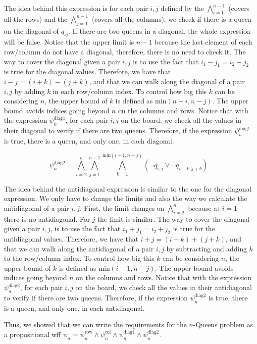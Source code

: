 \documentclass[11pt]{article}
\begin{document}
The idea behind this expression is for each pair $i, j$ defined by the $\bigwedge\limits_{i=1}^{n-1}$ (covers all the rows) and the $\bigwedge\limits_{j=1}^{n-1}$ (covers all the columns), we check if there is a queen on the diagonal of $q_{ij}$. If there are two queens in a diagonal, the whole expression will be false. Notice that the upper limit is $n-1$ because the last element of each row/column do not have a diagonal, therefore, there is no need to check it. The way to cover the diagonal given a pair $i, j$ is to use the fact that $i_1 - j_1 = i_2 - j_2$ is true for the diagonal values. Therefore, we have that $i - j = (i + k) - (j + k)$, and that we can walk along the diagonal of a pair $i, j$ by adding $k$ in each row/column index. To control how big this $k$ can be considering $n$, the upper bound of $k$ is defined as $\text{min}(n-i, n-j)$. The upper bound avoids indices going beyond $n$ on the columns and rows. Notice that with the expression $\psi_n^{\text{diag1}}$, for each pair $i,j$ on the board, we check all the values in their diagonal to verify if there are two queens. Therefore, if the expression $\psi_n^{\text{diag1}}$ is true, there is a queen, and only one, in each diagonal.

$$\psi_n^{\text{diag2}} = \bigwedge_{i=2}^{n}\bigwedge_{j=1}^{n-1}\bigwedge_{k=1}^{\text{min}(i-1, n-j)} (\lnot q_{i, j} \lor \lnot q_{i-k,j+k})$$

The idea behind the antidiagonal expression is similar to the one for the diagonal expression. We only have to change the limits and also the way we calculate the antidiagonal of a pair $i, j$. First, the limit changes on $\bigwedge\limits_{i=2}^{n}$ because at $i = 1$ there is no antidiagonal. For $j$ the limit is similar. The way to cover the diagonal given a pair $i, j$, is to use the fact that $i_1 + j_1 = i_2 + j_2$ is true for the antidiagonal values. Therefore, we have that $i + j = (i - k) + (j + k)$, and that we can walk along the antidiagonal of a pair $i,j$ by subtracting and adding $k$ to the row/column index. To control how big this $k$ can be considering $n$, the upper bound of $k$ is defined as $\text{min}(i-1, n-j)$. The upper bound avoids indices going beyond $n$ on the columns and rows.  Notice that with the expression $\psi_n^{\text{diag2}}$, for each pair $i,j$ on the board, we check all the values in their antidiagonal to verify if there are two queens. Therefore, if the expression $\psi_n^{\text{diag2}}$ is true, there is a queen, and only one, in each antidiagonal.

Thus, we showed that we can write the requirements for the $n$-Queens problem as a propositional wff $\psi_n = \psi_n^{\text{row}} \land \psi_n^{\text{col}} \land \psi_n^{\text{diag1}} \land \psi_n^{\text{diag2}}$.
\end{document}
